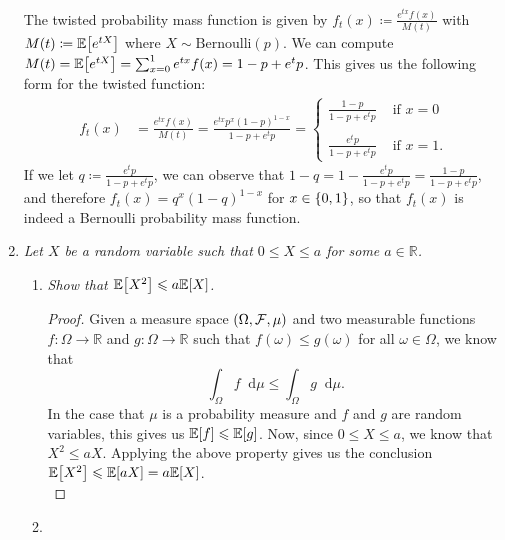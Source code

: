 \documentclass[11pt, a4paper]{article}
\renewcommand{\leq}{\leqslant}
\newcommand{\defn}{\coloneqq}
\newcommand*\diff{\mathop{}\!\mathrm{d}}
\newcommand{\E}[1]{\mathbb{E}\sqparens*{#1}}
\DeclarePairedDelimiter \set{\lbrace}{\rbrace}
\DeclarePairedDelimiter \parens{(}{)}
\DeclarePairedDelimiter \sqparens{[}{]}
\begin{document}
\begin{enumerate}
        The twisted probability mass function is given by $f_t(x) \defn \frac{e^{tx}f(x)}{M(t)}$ with $M(t) \defn \E{e^{tX}}$ where $X \sim \text{Bernoulli}(p)$.
        We can compute $M(t) = \E{e^{tX}} = \sum_{x = 0}^{1}e^{tx}f(x) = 1 - p + e^tp$.
        This gives us the following form for the twisted function:
        \begin{align*}
            f_t(x) &= \frac{e^{tx}f(x)}{M(t)}
            = \frac{e^{tx}p^x(1 - p)^{1 - x}}{1 - p + e^tp}
            =
            \begin{cases}
                \displaystyle\frac{1 - p}{1 - p + e^tp} &\text{ if } x = 0\\
                \\
                \displaystyle\frac{e^tp}{1 - p + e^tp}  &\text{ if } x = 1.
            \end{cases}
        \end{align*}
        If we let $q \defn \frac{e^tp}{1 - p + e^tp}$, we can observe that $1 - q = 1 - \frac{e^tp}{1 - p + e^tp} = \frac{1 - p}{1 - p + e^tp}$,
        and therefore $f_t(x) = q^x(1 - q)^{1 - x}$ for $x \in \set*{0, 1}$, so that $f_t(x)$ is indeed a Bernoulli probability mass function.
    \item \label{2}
        {\it Let $X$ be a random variable such that $0 \leq X \leq a$ for some $a \in \mathbb{R}$.}
        \begin{enumerate}
            \item \label{2a}
                {\it Show that $\E{X^2} \leq a\E{X}$.}
                \begin{proof}
                    Given a measure space $\parens*{\Omega, \mathcal{F}, \mu}$ and two measurable functions $f: \Omega \to \mathbb{R}$ and $g: \Omega \to \mathbb{R}$
                    such that $f(\omega) \leq g(\omega)$ for all $\omega \in \Omega$, we know that
                    \begin{equation*}
                        \int_{\Omega}f\diff{\mu} \leq \int_{\Omega}g\diff{\mu}.
                    \end{equation*}
                    In the case that $\mu$ is a probability measure and $f$ and $g$ are random variables, this gives us $\E{f} \leq \E{g}$.
                    Now, since $0 \leq X \leq a$, we know that $X^2 \leq aX$. Applying the above property gives us the conclusion $\E{X^2} \leq \E{aX} = a\E{X}$.\\
                \end{proof}
            \item \label{2b}

\end{enumerate}
\end{enumerate}
\end{document}
